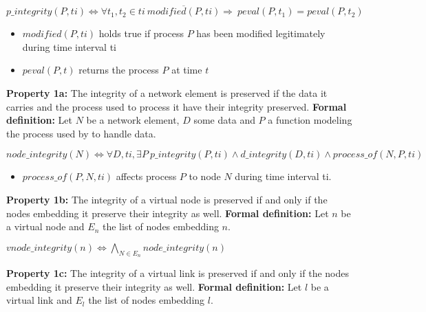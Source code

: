 \begin{myformula}
$p\_integrity(P, ti) \Leftrightarrow \forall t_1,t_2 \in ti~ \overline{modified(P, ti)}\Rightarrow 
~peval(P,t_1)=peval(P,t_2) $
\end{myformula}

\begin{itemize}
\item $modified(P,ti)$ holds true if process $P$ has been modified legitimately during time interval ti
\item $peval(P,t)$ returns the process $P$ at time $t$
\end{itemize}


\textbf{Property 1a:} The integrity of a network element is preserved if the data it carries and the process used to process it have their integrity preserved. 
\newline
\textbf{Formal definition:} Let $N$ be a network element, $D$ some data and $P$ a function modeling the process used by to handle data.

\begin{myformula}
$node\_integrity(N) \Leftrightarrow \forall D,ti,\exists P~p\_integrity(P,ti) \wedge d\_integrity(D,ti) \wedge process\_of(N,P,ti)$
\end{myformula}

\begin{itemize}
\item $process\_of(P,N,ti)$ affects process $P$ to node $N$ during time interval ti.
\end{itemize}

\textbf{Property 1b:} The integrity of a virtual node is preserved if and only if the nodes embedding it preserve their integrity as well.
\newline
\textbf{Formal definition:} Let $n$ be a virtual node and $E_n$ the list of nodes embedding $n$.

\begin{myformula}
$vnode\_integrity(n) \Leftrightarrow \bigwedge\limits_{N \in E_n} node\_integrity(n)$
\end{myformula}

\textbf{Property 1c:} The integrity of a virtual link is preserved if and only if the nodes embedding it preserve their integrity as well.
\newline
\textbf{Formal definition:} Let $l$ be a virtual link and $E_l$ the list of nodes embedding $l$.

